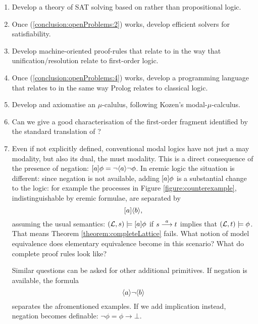 \begin{enumerate}
\item\label{conclusion:openProblems:2}  Develop a theory of SAT solving based on \ELABR{} rather than
  propositional logic.

\item Once (\ref{conclusion:openProblems:2}) works, develop efficient
  solvers for \ELABR{} satisfiability.

\item\label{conclusion:openProblems:4} Develop machine-oriented proof-rules that relate to \ELABR{}
  in the way that unification/resolution relate to first-order logic.

\item Once (\ref{conclusion:openProblems:4}) works, develop a
  programming language that relates to \ELABR{} in the same way
  Prolog relates to classical logic.

\item Develop and axiomatise an \ELABR{} $\mu$-calulus, following
  Kozen's modal-$\mu$-calculus.

\item Can we give a good characterisation of the first-order fragment
  identified by the standard translation of \ELFULL{}?
  
\item Even if not explicitly defined, conventional modal logics have
  not just a may modality, but also its dual, the must modality. This
  is a direct consequence of the presence of negation: $[ a ] \phi
  = \neg \langle a \rangle \neg \phi$. In eremic logic the situation is
  different: since negation is not available, adding $[ a ] \phi$
  is a substantial change to the logic: for example the processes in
  Figure \ref{figure:counterexample}, indistinguishable by eremic
  formulae, are separated by 
  \[
     [ a ] \langle b \rangle,
  \]
  assuming the usual semantics: $(\mathcal{L}, s) \models [ a ] \phi$ if
  $s \stackrel{a}{\longrightarrow} t$ implies that $(\mathcal{L}, t) \models \phi$. That means
  Theorem \ref{theorem:completeLattice} fails. What notion of model
  equivalence does elementary equivalence become in this scenario?
  What do complete proof rules look like?

  Similar questions can be asked for other additional primitives. If negation is 
  available, the formula
  \[
     \langle a \rangle \neg \langle b \rangle
  \]
  separates the afromentioned examples. If we add implication instead,
  negation becomes definable: $\neg \phi = \phi \rightarrow \bot$.


\end{enumerate}

